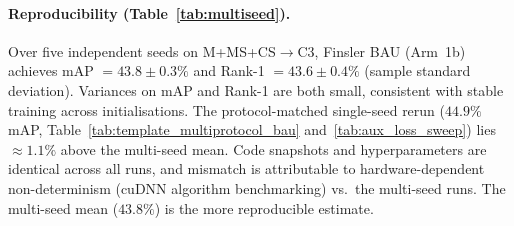 \paragraph{Reproducibility (Table~\ref{tab:multiseed}).}
Over five independent seeds on M+MS+CS$\rightarrow$C3, Finsler BAU (Arm~1b) achieves mAP $= 43.8 \pm 0.3\%$ and Rank-1 $= 43.6 \pm 0.4\%$ (sample standard deviation). Variances on mAP and Rank-1 are both small, consistent with stable training across initialisations. The protocol-matched single-seed rerun ($44.9\%$ mAP, Table~\ref{tab:template_multiprotocol_bau} and~\ref{tab:aux_loss_sweep}) lies ${\approx}1.1\%$ above the multi-seed mean. Code snapshots and hyperparameters are identical across all runs, and mismatch is attributable to hardware-dependent non-determinism (cuDNN algorithm benchmarking) vs.\ the multi-seed runs. The multi-seed mean ($43.8\%$) is the more reproducible estimate.

